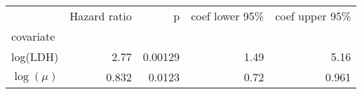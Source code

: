 \begin{tabular}{lrrrr}
\toprule
{} &  Hazard ratio &       p &  coef lower 95\% &  coef upper 95\% \\
covariate   &               &         &                  &                  \\
\midrule
log(LDH)    &          2.77 & 0.00129 &             1.49 &             5.16 \\
$\log(\mu)$ &         0.832 &  0.0123 &             0.72 &            0.961 \\
\bottomrule
\end{tabular}
